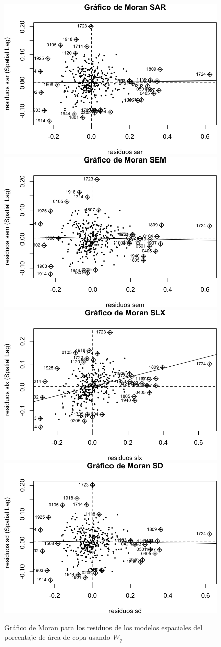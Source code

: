 \documentclass[12pt,]{book}
\begin{document}
\begin{figure}
\includegraphics[width=0.49\linewidth]{tesis-unigis_files/figure-latex/moranplot-resmodel-all-copaap-wq-1} \includegraphics[width=0.49\linewidth]{tesis-unigis_files/figure-latex/moranplot-resmodel-all-copaap-wq-2} \includegraphics[width=0.49\linewidth]{tesis-unigis_files/figure-latex/moranplot-resmodel-all-copaap-wq-3} \includegraphics[width=0.49\linewidth]{tesis-unigis_files/figure-latex/moranplot-resmodel-all-copaap-wq-4} \caption{Gráfico de Moran para los residuos de los modelos espaciales del porcentaje de área de copa usando $W_{q}$}\label{fig:moranplot-resmodel-all-copaap-wq}
\end{figure}
\end{document}
